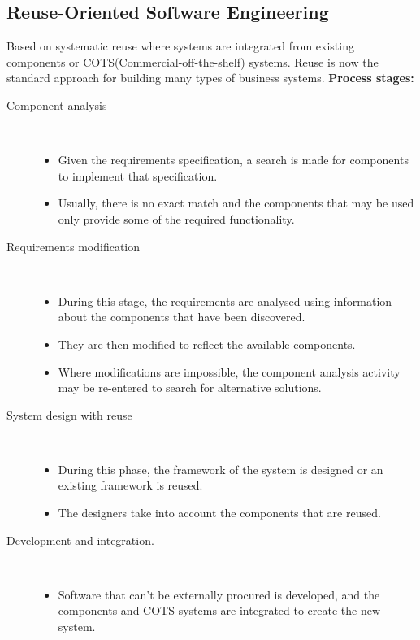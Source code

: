 \documentclass{report}
\begin{document}
\subsection{Reuse-Oriented Software Engineering}
Based on systematic reuse where systems are integrated from existing components or COTS(Commercial-off-the-shelf) systems. Reuse is now the standard approach for building many types of business systems.\newline
\textbf{Process stages:}
\begin{description}
  \item [Component analysis] \
  \begin{itemize}
    \item Given the requirements specification, a search is made for components to implement that specification.
    \item Usually, there is no exact match and the components that may be used only provide some of the required functionality.
  \end{itemize}
  \item[Requirements modification] \
  \begin{itemize}
  \item During this stage, the requirements are analysed using information about the components that have been discovered.
  \item They are then modified to reflect the available components.
  \item Where modifications are impossible, the component analysis activity may be re-entered to search for alternative solutions.
  \end{itemize}
  \item [System design with reuse] \
  \begin{itemize}
  \item During this phase, the framework of the system is designed or an existing framework is reused.
  \item The designers take into account the components that are reused.
  \end{itemize}
  \item [Development and integration.] \
  \begin{itemize}
   \item Software that can’t be externally procured is developed, and the components and COTS systems are integrated to create the new system.
  \end{itemize}
\end{description}
\end{document}
